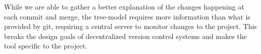 \documentclass[conference, draftclsnofoot]{IEEEtran}
\begin{document}
While we are able to gather a better explanation of the changes happening at
each commit and merge, the tree-model requires more information than what is
provided by git, requiring a central server to monitor changes to the project.
This breaks the design goals of decentralized version control systems and makes
the tool specific to the project.




\balance
\end{document}
